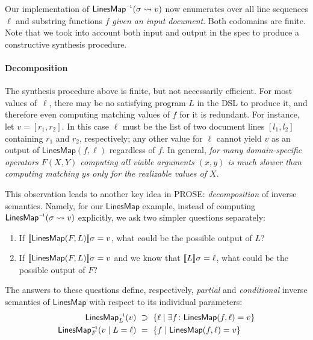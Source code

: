 Our implementation of $\mathsf{LinesMap}^{{\scriptscriptstyle-\!1}}(\sigma \rightsquigarrow v)$ now enumerates over all line sequences
$\ell$ and substring functions $f$ \emph{given an input document}.
Both codomains are finite.
Note that we took into account both input and output in the spec to produce a constructive synthesis procedure.

\paragraph{Decomposition}
The synthesis procedure above is finite, but not necessarily efficient.
For most values of~$\ell$, there may be no satisfying program $L$ in the DSL to produce it, and therefore even
computing matching values of $f$ for it is redundant.
For instance, let $v = [r_1, r_2]$.
In this case $\ell$ must be the list of two document lines $[l_1, l_2]$ containing $r_1$ and $r_2$, respectively; any
other value for $\ell$ cannot yield $v$ as an output of $\mathsf{LinesMap}(f, \ell)$ regardless of $f$.
In general, \emph{for many domain-specific operators $F(X, Y)$ computing all viable
arguments $(x, y)$ is much slower than computing matching $y$s only for the realizable values of $X$}.

This observation leads to another key idea in PROSE: \emph{decomposition} of inverse semantics.
Namely, for our $\mathsf{LinesMap}$ example, instead of computing $\mathsf{LinesMap}^{{\scriptscriptstyle-\!1}}(\sigma \rightsquigarrow v)$
explicitly, we ask two simpler questions separately:
\begin{enumerate}[nosep]
    \item If $\llbracket \mathsf{LinesMap}(F, L) \rrbracket{\ensuremath{\sigma}} = v$, what could be the possible output of $L$?
    \item If $\llbracket \mathsf{LinesMap}(F, L) \rrbracket{\ensuremath{\sigma}} = v$ and we know that $\llbracket L \rrbracket{\ensuremath{\sigma}} = \ell$, what
        could be the possible output of $F$?
\end{enumerate}
The answers to these questions define, respectively, \emph{partial} and \emph{conditional} inverse semantics of
$\mathsf{LinesMap}$ with respect to its individual parameters:
\begingroup\allowdisplaybreaks
\begin{align}
    \mathsf{LinesMap}^{\inv}_L(v) \ &\supset\ \left\{ \ell \mid \exists f\colon \mathsf{LinesMap}(f, \ell) = v \right\}
    \label{eqn:derivation:inverse} \\
    \mathsf{LinesMap}^{\inv}_F (v \assuming L = \ell) \ &=\ \left\{ f \mid \mathsf{LinesMap}(f, \ell) = v \right\}
    \label{eqn:derivation:conditional}
\end{align}
\endgroup

